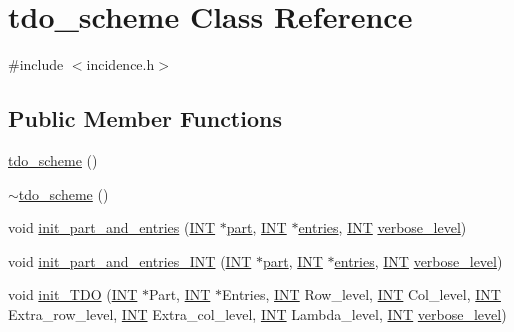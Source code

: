 \hypertarget{classtdo__scheme}{}\section{tdo\+\_\+scheme Class Reference}
\label{classtdo__scheme}


{\ttfamily \#include $<$incidence.\+h$>$}

\subsection*{Public Member Functions}
\begin{DoxyCompactItemize}
\item 
\mbox{\hyperlink{classtdo__scheme_acbcae27463e33e17820c87864f0694f4}{tdo\+\_\+scheme}} ()
\item 
\mbox{\hyperlink{classtdo__scheme_ac1faaab1344d50800638910b29f960c6}{$\sim$tdo\+\_\+scheme}} ()
\item 
void \mbox{\hyperlink{classtdo__scheme_ac5a97ae486a59bc883eb1ead1c6fd9b4}{init\+\_\+part\+\_\+and\+\_\+entries}} (\mbox{\hyperlink{galois_8h_a09fddde158a3a20bd2dcadb609de11dc}{I\+NT}} $\ast$\mbox{\hyperlink{classtdo__scheme_a670c75bc7276a4dac4c12656e3906924}{part}}, \mbox{\hyperlink{galois_8h_a09fddde158a3a20bd2dcadb609de11dc}{I\+NT}} $\ast$\mbox{\hyperlink{classtdo__scheme_ae4ca55108570de285018959258103fb3}{entries}}, \mbox{\hyperlink{galois_8h_a09fddde158a3a20bd2dcadb609de11dc}{I\+NT}} \mbox{\hyperlink{simeon_8_c_a818073fbcc2f439e7c56952f67386122}{verbose\+\_\+level}})
\item 
void \mbox{\hyperlink{classtdo__scheme_aa2b76681ac4c2cba7aeeb0ce2c231450}{init\+\_\+part\+\_\+and\+\_\+entries\+\_\+\+I\+NT}} (\mbox{\hyperlink{galois_8h_a09fddde158a3a20bd2dcadb609de11dc}{I\+NT}} $\ast$\mbox{\hyperlink{classtdo__scheme_a670c75bc7276a4dac4c12656e3906924}{part}}, \mbox{\hyperlink{galois_8h_a09fddde158a3a20bd2dcadb609de11dc}{I\+NT}} $\ast$\mbox{\hyperlink{classtdo__scheme_ae4ca55108570de285018959258103fb3}{entries}}, \mbox{\hyperlink{galois_8h_a09fddde158a3a20bd2dcadb609de11dc}{I\+NT}} \mbox{\hyperlink{simeon_8_c_a818073fbcc2f439e7c56952f67386122}{verbose\+\_\+level}})
\item 
void \mbox{\hyperlink{classtdo__scheme_a6e96a46806b69b0dce089b38da19ddc8}{init\+\_\+\+T\+DO}} (\mbox{\hyperlink{galois_8h_a09fddde158a3a20bd2dcadb609de11dc}{I\+NT}} $\ast$Part, \mbox{\hyperlink{galois_8h_a09fddde158a3a20bd2dcadb609de11dc}{I\+NT}} $\ast$Entries, \mbox{\hyperlink{galois_8h_a09fddde158a3a20bd2dcadb609de11dc}{I\+NT}} Row\+\_\+level, \mbox{\hyperlink{galois_8h_a09fddde158a3a20bd2dcadb609de11dc}{I\+NT}} Col\+\_\+level, \mbox{\hyperlink{galois_8h_a09fddde158a3a20bd2dcadb609de11dc}{I\+NT}} Extra\+\_\+row\+\_\+level, \mbox{\hyperlink{galois_8h_a09fddde158a3a20bd2dcadb609de11dc}{I\+NT}} Extra\+\_\+col\+\_\+level, \mbox{\hyperlink{galois_8h_a09fddde158a3a20bd2dcadb609de11dc}{I\+NT}} Lambda\+\_\+level, \mbox{\hyperlink{galois_8h_a09fddde158a3a20bd2dcadb609de11dc}{I\+NT}} \mbox{\hyperlink{simeon_8_c_a818073fbcc2f439e7c56952f67386122}{verbose\+\_\+level}})

\end{DoxyCompactItemize}
